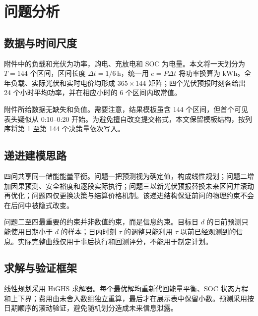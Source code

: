 \section{问题分析}

\subsection{数据与时间尺度}

附件中的负载和光伏为功率，购电、充放电和 SOC 为电量。本文将一天划分为 $T=144$ 个区间，区间长度 $\Delta t=1/6\,\mathrm h$，统一用 $e=P\Delta t$ 将功率换算为 $\mathrm{kWh}$。全年负载、实际光伏和实时电价均形成 $365\times144$ 矩阵；四个光伏预报时刻各给出 24 个小时平均功率，并在相应小时的 6 个区间内取常值。

附件所给数据无缺失和负值。需要注意，结果模板虽含 144 个区间，但首个可见表头疑似从 0:10--0:20 开始。为避免擅自改变提交格式，本文保留模板结构，按列序将第 1 至第 144 个决策量依次写入。

\subsection{递进建模思路}

四问共享同一储能能量平衡。问题一把预测视为确定值，构成线性规划；问题二增加因果预测、安全裕度和逐段实际执行；问题三以新光伏预报替换未来区间并滚动再优化；问题四仅更换决策与结算价格机制。该递进结构保证前问的物理约束不会在后问中被隐式改变。

问题二至四最重要的约束并非数值约束，而是信息约束。目标日 $d$ 的日前预测只能使用日期小于 $d$ 的样本；日内时刻 $\tau$ 的调整只能利用 $\tau$ 以前已经观测到的信息。实际完整曲线仅用于事后执行和回测评分，不能用于制定计划。

\subsection{求解与验证框架}

线性规划采用 HiGHS 求解器\cite{virtanen2020}。每个最优解均重新代回能量平衡、SOC 状态方程和上下界；费用由未舍入数组独立重算，最后才在展示表中保留小数。预测采用按日期顺序的滚动验证，避免随机划分造成未来信息泄露\cite{hyndman2021}。
